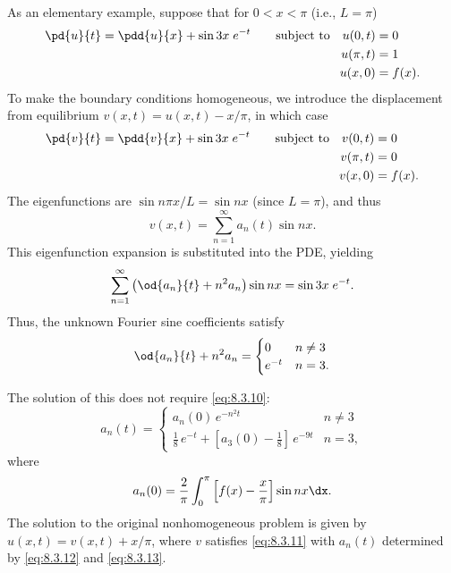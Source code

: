 \begin{example}
As an elementary example, suppose that for $0 < x < \pi$ (i.e., $L=\pi$)
\begin{alignat*}{2}
\pd{u}{t} &= \pdd{u}{x} + \sin 3x\;e^{-t} &\quad\text{subject to}\quad u(0,t) &= 0 \\
& & u(\pi,t) &= 1 \\
& & u(x,0) &= f(x).
\end{alignat*}
To make the boundary conditions homogeneous, we introduce the displacement from equilibrium $v(x,t) = u(x,t) - x/\pi$, in which case
\begin{alignat*}{2}
\pd{v}{t} &= \pdd{v}{x} + \sin 3x\;e^{-t} &\quad\text{subject to}\quad v(0,t) &= 0 \\
& & v(\pi,t) &= 0 \\
& & v(x,0) &= f(x).
\end{alignat*}
The eigenfunctions are $\sin n\pi x/L = \sin nx$ (since $L=\pi$), and thus
\begin{equation}
\label{eq:8.3.11}
v(x,t) = \sum_{n=1}^{\infty} a_n(t)\sin nx.
\end{equation}
This eigenfunction expansion is substituted into the PDE, yielding
\[
\sum_{n=1}^{\infty}\left(\od{a_n}{t} + n^2 a_n\right)\sin nx = \sin 3x\;e^{-t}.
\]
Thus, the unknown Fourier sine coefficients satisfy
\[
\od{a_n}{t} + n^2 a_n =
\begin{cases}
0 & n\neq 3 \\
e^{-t} & n = 3.
\end{cases}
\]
\end{example}

The solution of this does not require \eqref{eq:8.3.10}:
\begin{equation}
\label{eq:8.3.12}
a_n(t) =
\begin{cases}
a_n(0)\,e^{-n^2 t} & n\neq 3 \\[4pt]
\tfrac{1}{8}\,e^{-t} + [a_3(0)-\tfrac{1}{8}]\,e^{-9t} & n = 3,
\end{cases}
\end{equation}
where
\begin{equation}
\label{eq:8.3.13}
a_n(0) = \frac{2}{\pi}\int_0^{\pi}\left[f(x) - \frac{x}{\pi}\right]\sin nx\dx.
\end{equation}
The solution to the original nonhomogeneous problem is given by $u(x,t) = v(x,t) + x/\pi$, where $v$ satisfies \eqref{eq:8.3.11} with $a_n(t)$ determined by \eqref{eq:8.3.12} and \eqref{eq:8.3.13}.

